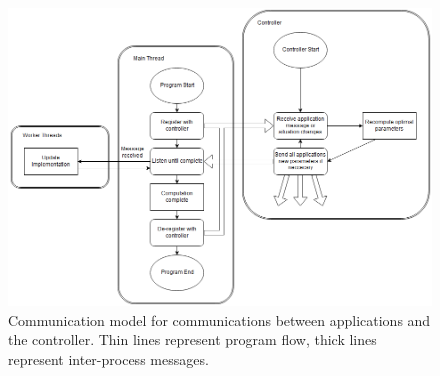 \begin{figure}
	\centering
	\includegraphics[width=\textwidth]{graphics/controller_communication_flowchart.png}
	\caption{Communication model for communications between applications and the controller. Thin lines represent program flow, thick lines represent inter-process messages.}
	\label{fig:controller_flowchart}
\end{figure}



